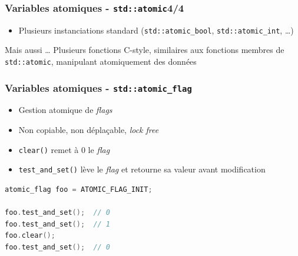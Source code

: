 \documentclass[C++.tex]{subfiles}
\begin{document}
\begin{frame}[fragile]
	\frametitle{Variables atomiques - \lstinline|std::atomic|\titlehfill{}4/4}
	\begin{itemize}
		\item Plusieurs instanciations standard (\lstinline|std::atomic_bool|, \lstinline|std::atomic_int|, \ldots)
	\end{itemize}

	\begin{block}{Mais aussi \ldots}
		Plusieurs fonctions \og C-style\fg{}, similaires aux fonctions membres de \lstinline|std::atomic|, manipulant atomiquement des données
	\end{block}
\end{frame}

\begin{frame}[fragile]
	\frametitle{Variables atomiques - \lstinline|std::atomic_flag|}
	\begin{itemize}
		\item Gestion atomique de \textit{flags}
		\item Non copiable, non déplaçable, \textit{lock free}
		\item \lstinline|clear()| remet à 0 le \textit{flag}
		\item \lstinline|test_and_set()| lève le \textit{flag} et retourne sa valeur avant modification
	\end{itemize}

	\begin{lstlisting}[language=C++]
atomic_flag foo = ATOMIC_FLAG_INIT;

foo.test_and_set();  // 0
foo.test_and_set();  // 1
foo.clear();
foo.test_and_set();  // 0\end{lstlisting}
\end{frame}
\end{document}
